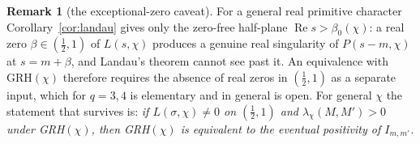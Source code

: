 \documentclass[11pt]{amsart}
\theoremstyle{definition}
\newtheorem{remark}[theorem]{Remark}
\numberwithin{equation}{section}
\newcommand{\re}{\operatorname{Re}}
\begin{document}
\begin{remark}[the exceptional-zero caveat]\label{rem:exceptional}
For a general real primitive character Corollary~\ref{cor:landau}
gives only the zero-free half-plane $\re s>\beta_0(\chi)$: a real
zero $\beta\in(\tfrac12,1)$ of $L(s,\chi)$ produces a genuine real
singularity of $P(s-m,\chi)$ at $s=m+\beta$, and Landau's theorem
cannot see past it. An equivalence with GRH$(\chi)$ therefore
requires the absence of real zeros in $(\tfrac12,1)$ as a separate
input, which for $q=3,4$ is elementary and in general is open. For
general $\chi$ the statement that survives is: \emph{if
$L(\sigma,\chi)\ne0$ on $(\tfrac12,1)$ and $\lambda_\chi(M,M')>0$
under GRH$(\chi)$, then GRH$(\chi)$ is equivalent to the eventual
positivity of $I_{m,m'}$.}
\end{remark}
\end{document}
